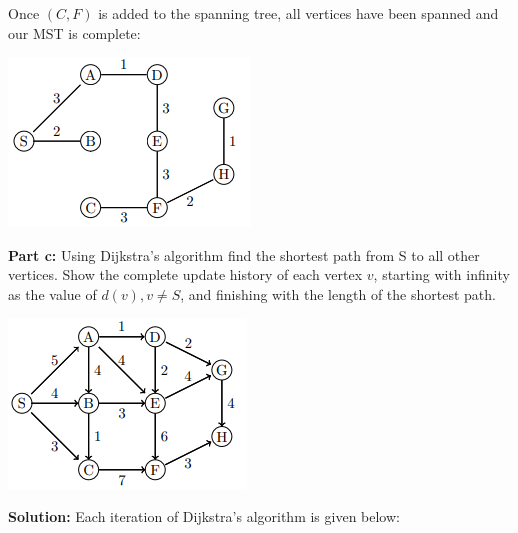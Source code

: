 \documentclass{article}
\begin{document}
Once $(C,F)$ is added to the spanning tree, all vertices have been spanned and our MST is complete:
\begin{center}
  \includegraphics{graph4bMST.png}
\end{center}
\newpage

\noindent\textbf{Part c:} Using Dijkstra’s algorithm find the shortest path from S to all other vertices. Show the complete update history of each vertex $v$, starting with infinity as the value of $d(v), v\not= S$, and finishing with the length of the shortest path.
\begin{center}
  \includegraphics{graph4c.png}
\end{center}
\bigskip

\noindent\textbf{Solution:} Each iteration of Dijkstra’s algorithm is given below:
\bigskip
\end{document}
